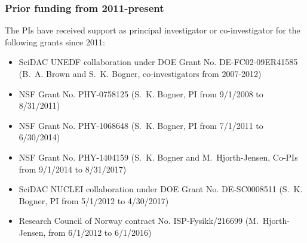 \subsubsection{Prior funding from 2011-present}
The PIs have received support as principal investigator or
co-investigator for the following grants since 2011:
\begin{itemize}
\item SciDAC UNEDF collaboration under DOE Grant No. DE-FC02-09ER41585 (B.~A. Brown and S.~K. Bogner, co-investigators from 2007-2012)
\item NSF Grant No. PHY-0758125 (S.~K. Bogner, PI from 9/1/2008 to 8/31/2011)
\item NSF Grant No. PHY-1068648 (S.~K. Bogner, PI from 7/1/2011 to 6/30/2014)
\item NSF Grant No. PHY-1404159 (S.~K. Bogner and M.~Hjorth-Jensen, Co-PIs from 9/1/2014 to 8/31/2017)
\item SciDAC NUCLEI collaboration under DOE Grant No. DE-SC0008511 (S.~K. Bogner, PI from 5/1/2012 to 4/30/2017)
\item Research Council of Norway contract No. ISP-Fysikk/216699 (M.~Hjorth-Jensen, from 6/1/2012 to 6/1/2016)
\end{itemize}





